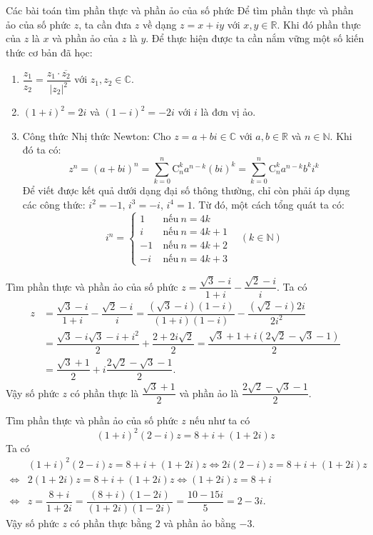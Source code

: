\begin{dang}{Các bài toán tìm phần thực và phần ảo của số phức}
	Để tìm phần thực và phần ảo của số phức $z$, ta cần đưa $z$ về dạng $z=x+iy$ với $x,y \in \mathbb{R}$. Khi đó phần thực của $z$ là $x$ và phần ảo của $z$ là $y$. Để thực hiện được ta cần nắm vững một số kiến thức cơ bản đã học:
	\begin{enumerate}[\bfseries 1)]
		\item $\dfrac{z_1}{z_2} = \dfrac{z_1 \cdot \overline{z_2}}{\left|z_2\right|^2}$ với $z_1,z_2 \in \mathbb{C}$.
		\item $(1+i)^2=2i$ và $(1-i)^2=-2i$ với $i$ là đơn vị ảo.
		\item Công thức Nhị thức Newton: Cho $z=a+bi \in \mathbb{C}$ với $a,b \in \mathbb{R}$ và $n \in \mathbb{N}$. Khi đó ta có:
		\[z^n = (a+bi)^n = \displaystyle \sum_{k=0}^{n} \mathrm{C}_n^k a^{n-k}(bi)^k = \displaystyle \sum_{k=0}^{n} \mathrm{C}_n^k a^{n-k} b^k i^k\]
		Để viết được kết quả dưới dạng đại số thông thường, chỉ còn phải áp dụng các công thức: $i^2=-1$, $i^3=-i$, $i^4=1$. Từ đó, một cách tổng quát ta có:
		\[i^n = \left\{\begin{aligned}  1~&\text{nếu}~n=4k \\ i~&\text{nếu}~n=4k+1 \\  -1~&\text{nếu}~n=4k+2 \\ -i~&\text{nếu}~n=4k+3 \end{aligned} \right. ~~~~(k \in \mathbb{N})\]
	\end{enumerate}
\end{dang}
\begin{vd}%
	Tìm phần thực và phần ảo của số phức $z=\dfrac{\sqrt{3}-i}{1+i} - \dfrac{\sqrt{2}-i}{i}$.
	\loigiai
	{
		Ta có
		\begin{align*}
		z &= \dfrac{\sqrt{3}-i}{1+i} - \dfrac{\sqrt{2}-i}{i} = \dfrac{(\sqrt{3}-i)(1-i)}{(1+i)(1-i)} - \dfrac{(\sqrt{2}-i)2i}{2i^2} \\
		&= \dfrac{\sqrt{3}-i\sqrt{3}-i+i^2}{2} + \dfrac{2+2i\sqrt{2}}{2} = \dfrac{\sqrt{3}+1+i(2\sqrt{2}-\sqrt{3}-1)}{2} \\
		&= \dfrac{\sqrt{3}+1}{2} + i \dfrac{2\sqrt{2}-\sqrt{3}-1}{2}.
		\end{align*}
		Vậy số phức $z$ có phần thực là $\dfrac{\sqrt{3}+1}{2}$ và phần ảo là $\dfrac{2\sqrt{2}-\sqrt{3}-1}{2}$.
	}
\end{vd}

\begin{vd}%
	Tìm phần thực và phần ảo của số phức $z$ nếu như ta có
	\[(1+i)^2(2-i)z = 8+i+(1+2i)z\]
	\loigiai 
	{
		Ta có
		\begin{align*}
		&(1+i)^2(2-i)z = 8+i+(1+2i)z \Leftrightarrow 2i(2-i)z = 8+i+(1+2i)z \\
		\Leftrightarrow & 2(1+2i)z = 8+i+(1+2i)z \Leftrightarrow (1+2i)z = 8+i \\
		\Leftrightarrow & z = \dfrac{8+i}{1+2i} = \dfrac{(8+i)(1-2i)}{(1+2i)(1-2i)} = \dfrac{10-15i}{5} = 2-3i.
		\end{align*}
		Vậy số phức $z$ có phần thực bằng $2$ và phần ảo bằng $-3$.
	}
\end{vd}

